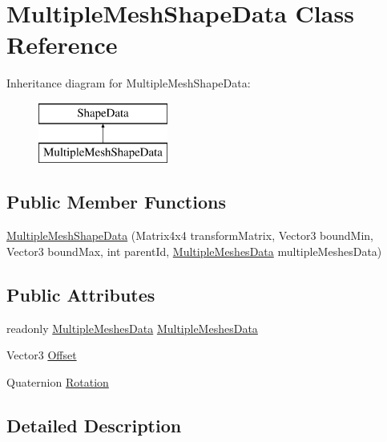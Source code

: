 \hypertarget{class_multiple_mesh_shape_data}{}\section{Multiple\+Mesh\+Shape\+Data Class Reference}
\label{class_multiple_mesh_shape_data}
Inheritance diagram for Multiple\+Mesh\+Shape\+Data\+:\begin{figure}[H]
\begin{center}
\leavevmode
\includegraphics[height=2.000000cm]{class_multiple_mesh_shape_data}
\end{center}
\end{figure}
\subsection*{Public Member Functions}
\begin{DoxyCompactItemize}
\item 
\mbox{\hyperlink{class_multiple_mesh_shape_data_a58d64b20953f7a4116e518e5dfa0c301}{Multiple\+Mesh\+Shape\+Data}} (Matrix4x4 transform\+Matrix, Vector3 bound\+Min, Vector3 bound\+Max, int parent\+Id, \mbox{\hyperlink{class_multiple_meshes_data}{Multiple\+Meshes\+Data}} multiple\+Meshes\+Data)
\end{DoxyCompactItemize}
\subsection*{Public Attributes}
\begin{DoxyCompactItemize}
\item 
readonly \mbox{\hyperlink{class_multiple_meshes_data}{Multiple\+Meshes\+Data}} \mbox{\hyperlink{class_multiple_mesh_shape_data_a2ffb02bda59bf4da93a025537d762b54}{Multiple\+Meshes\+Data}}
\item 
Vector3 \mbox{\hyperlink{class_multiple_mesh_shape_data_a0b948060fcca07176b1083c3db30c2b6}{Offset}}
\item 
Quaternion \mbox{\hyperlink{class_multiple_mesh_shape_data_a102a4edea562cc4e7527df92911e0e57}{Rotation}}
\end{DoxyCompactItemize}


\subsection{Detailed Description}


